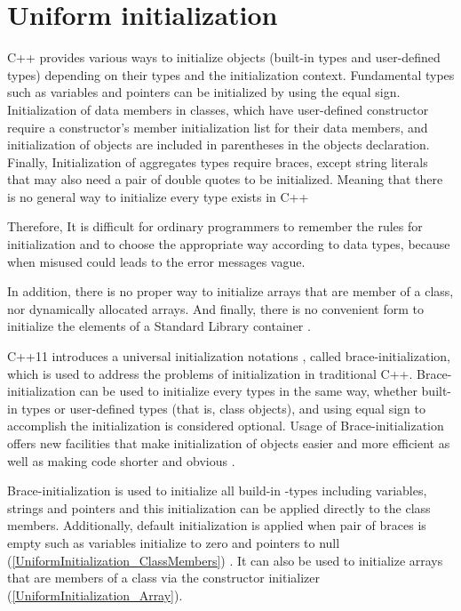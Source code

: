 \documentclass[11pt]{report}
\begin{document}
\section{Uniform initialization}
\label{section:Uniform initialization}
C++ provides various ways to initialize objects (built-in types and user-defined types) depending on their types and the initialization context. Fundamental types such as variables and pointers can be initialized by using the equal sign. Initialization of data members in classes, which have user-defined constructor require a constructor's member initialization list for their data members, and initialization of objects are included in parentheses in the objects declaration. Finally, Initialization of aggregates types require braces, except string literals that may also need a pair of double quotes to be initialized. Meaning that there is no general way to initialize every type exists in C++ \cite{Stroustrup:2012:Cpp11}


Therefore, It is difficult for ordinary programmers to remember the rules for initialization and to choose the appropriate way according to data types, because when misused could leads to the error messages vague.


In addition, there is no proper way to initialize arrays that are member of a class, nor dynamically allocated arrays. And finally, there is no convenient form to initialize the elements of a Standard Library container \cite{Stroustrup:2012:Cpp11}.


C++11 introduces a universal initialization notations { }, called brace-initialization, which is used to address the problems of initialization in traditional C++. Brace-initialization can be used to initialize every types in the same way, whether built-in types or user-defined types (that is, class objects), and using equal sign to accomplish the initialization is considered optional. Usage of Brace-initialization offers new facilities that make initialization of objects easier and more efficient as well as making code shorter and obvious \cite{Reddy:2011:API}.


Brace-initialization is used to initialize all build-in -types including variables, strings and pointers and this initialization can be applied directly to the class members. Additionally, default initialization is applied when pair of braces is empty such as variables initialize to zero and pointers to null (\ref{UniformInitialization_ClassMembers}) \cite{Reddy:2011:API}. It can also be used to initialize arrays that are members of a class via the constructor initializer (\ref{UniformInitialization_Array}).
\end{document}
